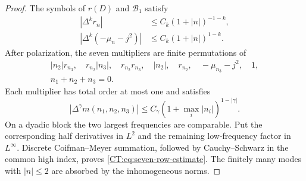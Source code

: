 \begin{proof}
The symbols of $r(D)$ and $\mathcal B_1$ satisfy
\begin{align*}
 |\Delta^kr_n|&\le C_k(1+|n|)^{-1-k},\\
 |\Delta^k(-\mu_n-j^2)|&\le C_k(1+|n|)^{1-k}.
\end{align*}
After polarization, the seven multipliers are finite permutations of
\begin{multline}\label{CT:eq:seven-symbols}
 |n_2|r_{n_3},\quad r_{n_2}|n_3|,\quad
 r_{n_2}r_{n_3},\quad |n_2|,\quad r_{n_2},\quad
 -\mu_{n_3}-j^2,\quad1,\\
 n_1+n_2+n_3=0.
\end{multline}
Each multiplier has total order at most one and satisfies
\begin{equation*}
 |\Delta^\gamma m(n_1,n_2,n_3)|
 \le C_\gamma(1+\max_i|n_i|)^{1-|\gamma|}.
\end{equation*}
On a dyadic block the two largest frequencies are comparable.  Put the
corresponding half derivatives in $L^2$ and the remaining low-frequency
factor in $L^\infty$.  Discrete Coifman--Meyer summation, followed by
Cauchy--Schwarz in the common high index, proves
\eqref{CT:eq:seven-row-estimate}.  The finitely many modes with
$|n|\le2$ are absorbed by the inhomogeneous norms.
\end{proof}

